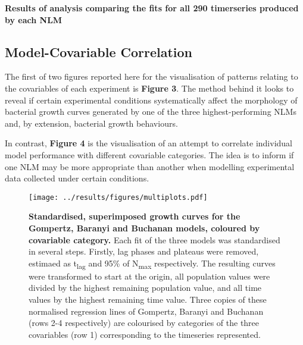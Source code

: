 \documentclass[11pt]{article}
\begin{document}
\begin{table}[htb]
    \centering
    \caption{\textbf{Results of analysis comparing the fits for all 290 timerseries produced by each NLM}}
\end{table}


\subsection{Model-Covariable Correlation}

The first of two figures reported here for the visualisation of patterns relating to the covariables of each experiment is \textbf{Figure 3}. The method behind it looks to reveal if certain experimental conditions systematically affect the morphology of bacterial growth curves generated by one of the three highest-performing NLMs and, by extension, bacterial growth behaviours. %

In contrast, \textbf{Figure 4} is the visualisation of an attempt to correlate individual model performance with different covariable categories. The idea is to inform if one NLM may be more appropriate than another when modelling experimental data collected under certain conditions. %


\begin{figure*}
    \centering
    \texttt{[image: ../results/figures/multiplots.pdf]} %
    \caption{\textbf{Standardised, superimposed growth curves for the Gompertz, Baranyi and Buchanan models, coloured by covariable category.}  Each fit of the three models was standardised in several steps. Firstly, lag phases and plateaus were removed, estimaed as t\textsubscript{lag} and 95\% of N\textsubscript{max} respectively. The resulting curves were transformed to start at the origin, all population values were divided by the highest remaining population value, and all time values by the highest remaining time value. Three copies of these normalised regression lines of Gompertz, Baranyi and Buchanan (rows 2-4 respectively) are colourised by categories of the three covariables (row 1) corresponding to the timeseries represented.}
\end{figure*}
\end{document}
